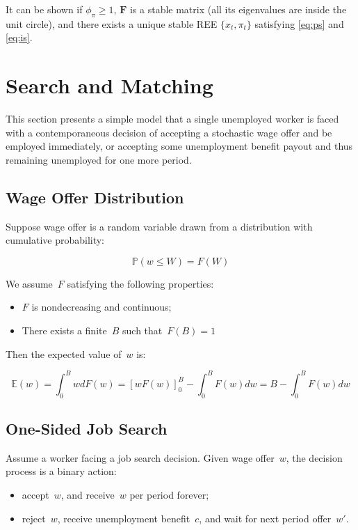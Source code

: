 \documentclass[10pt,a4]{article}
\providecommand{\tightlist}{\setlength{\itemsep}{0pt}\setlength{\parskip}{0pt}}%
\begin{document}
It can be shown if $\phi_\pi \ge 1$, $\mathbf F$ is a stable matrix (all its eigenvalues are inside the unit circle), and there exists a unique stable REE $\{x_t, \pi_t\}$ satisfying \eqref{eq:ps} and \eqref{eq:is}.

\newpage

\section{Search and Matching}

{\label{749203}}

This section presents a simple model that a single unemployed worker is
faced with a contemporaneous decision of accepting a stochastic wage
offer and be employed immediately, or accepting some unemployment
benefit payout and thus remaining unemployed for one more period.~

\subsection{Wage Offer Distribution}

{\label{189039}}

Suppose wage offer is a random variable drawn from a distribution with
cumulative probability:

$$ \mathbb{P}(w \le W) = F(W) $$

We assume~\(F\) satisfying the following properties:

\begin{itemize}
\tightlist
\item
  \(F\) is nondecreasing and continuous;
\item
  There exists a finite~\(B\) such that~\(F\left(B\right)=1\)
\end{itemize}

Then the expected value of~\(w\) is:

$$ \mathbb{E}(w) = \int_0^B w dF(w) = \left[wF(w)\right]_0^B - \int_0^B F(w)dw = B - \int_0^B F(w)dw $$

\subsection{One-Sided Job Search}

{\label{158547}}

Assume a worker facing a job search decision. Given wage
offer~\(w\), the decision process is a binary action:

\begin{itemize}
\tightlist
\item
  accept~\(w\), and receive~\(w\) per period
  forever;
\item
  reject~\(w\), receive unemployment
  benefit~\(c\), and wait for next period
  offer~\(w'\).
\end{itemize}
\end{document}
